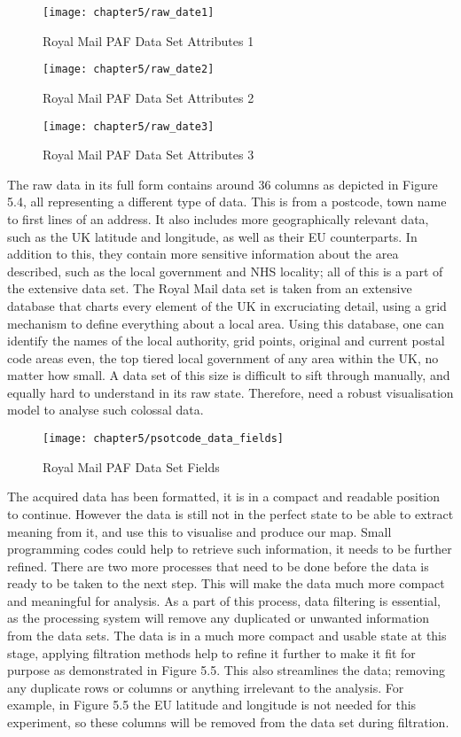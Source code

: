 \begin{figure}[H]
\centering
\texttt{[image: chapter5/raw\_date1]}
\caption{Royal Mail PAF Data Set Attributes 1}
\end{figure}

\begin{figure}[H]
\centering
\texttt{[image: chapter5/raw\_date2]}
\caption{Royal Mail PAF Data Set Attributes 2}
\end{figure}

\begin{figure}[H]
\centering
\texttt{[image: chapter5/raw\_date3]}
\caption{Royal Mail PAF Data Set Attributes 3}
\end{figure}

The raw data in its full form contains around 36 columns as depicted in Figure 5.4, all representing a different type of data. This is from a postcode, town name to first lines of an address. It also includes more geographically relevant data, such as the UK latitude and longitude, as well as their EU counterparts. In addition to this, they contain more sensitive information about the area described, such as the local government and NHS locality; all of this is a part of the extensive data set. The Royal Mail data set is taken from an extensive database that charts every element of the UK in excruciating detail, using a grid mechanism to define everything about a local area. Using this database, one can identify the names of the local authority, grid points, original and current postal code areas even, the top tiered local government of any area within the UK, no matter how small. A data set of this size is difficult to sift through manually, and equally hard to understand in its raw state. Therefore, need a robust visualisation model to analyse such colossal data.

\begin{figure}[H]
\centering
\texttt{[image: chapter5/psotcode\_data\_fields]}
\caption{Royal Mail PAF Data Set Fields}
\end{figure}

The acquired data has been formatted, it is in a compact and readable position to continue. However the data is still not in the perfect state to be able to extract meaning from it, and use this to visualise and produce our map. Small programming codes could help to retrieve such information, it needs to be further refined. There are two more processes that need to be done before the data is ready to be taken to the next step. This will make the data much more compact and meaningful for analysis. As a part of this process, data filtering is essential, as the processing system will remove any duplicated or unwanted information from the data sets. The data is in a much more compact and usable state at this stage, applying filtration methods help to refine it further to make it fit for purpose as demonstrated in Figure 5.5. This also streamlines the data; removing any duplicate rows or columns or anything irrelevant to the analysis. For example, in Figure 5.5 the EU latitude and longitude is not needed for this experiment, so these columns will be removed from the data set during filtration. 

